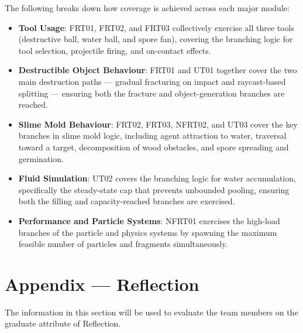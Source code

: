 \documentclass[12pt, titlepage]{article}
\begin{document}
The following breaks down how coverage is achieved across each major module:

\begin{itemize}
    \item \textbf{Tool Usage}: FRT01, FRT02, and FRT03 collectively exercise
    all three tools (destructive ball, water ball, and spore fan), covering
    the branching logic for tool selection, projectile firing, and on-contact
    effects.

    \item \textbf{Destructible Object Behaviour}: FRT01 and UT01 together cover
    the two main destruction paths --- gradual fracturing on impact and
    raycast-based splitting --- ensuring both the fracture and object-generation
    branches are reached.

    \item \textbf{Slime Mold Behaviour}: FRT02, FRT03, NFRT02, and UT03 cover
    the key branches in slime mold logic, including agent attraction to water,
    traversal toward a target, decomposition of wood obstacles, and spore
    spreading and germination.

    \item \textbf{Fluid Simulation}: UT02 covers the branching logic for water
    accumulation, specifically the steady-state cap that prevents unbounded
    pooling, ensuring both the filling and capacity-reached branches are exercised.

    \item \textbf{Performance and Particle Systems}: NFRT01 exercises the
    high-load branches of the particle and physics systems by spawning the
    maximum feasible number of particles and fragments simultaneously.
\end{itemize}

\newpage{}
\section*{Appendix --- Reflection}

The information in this section will be used to evaluate the team members on the
graduate attribute of Reflection.
\end{document}
